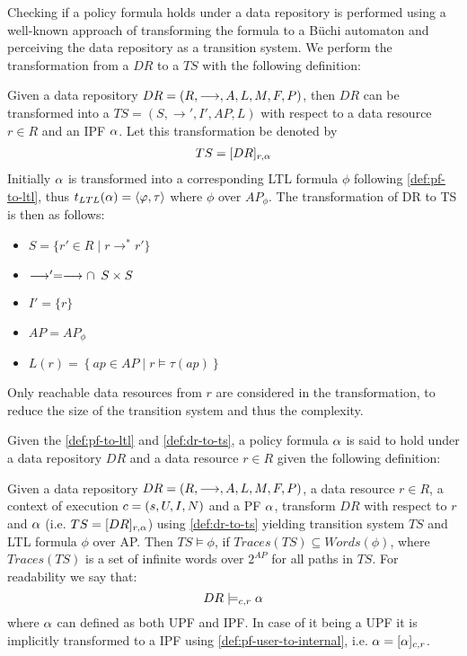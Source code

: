 Checking if a policy formula holds under a data repository is performed using a well-known approach of transforming the formula to a Büchi automaton and perceiving the data repository as a transition system. We perform the transformation from a $DR$ to a $TS$ with the following definition:
\begin{definition}\label{def:dr-to-ts}
Given a data repository $DR= \left( R, \longrightarrow, A, L, M, F, P \right)$, then $DR$ can be transformed into a $TS=\left(S, \longrightarrow', I', AP, L \right)$ with respect to a data resource $r \in R$ and an IPF $\alpha$. Let this transformation be denoted by
\begin{align*}
    TS = [DR]_{r,\alpha}    
\end{align*}
Initially $\alpha$ is transformed into a corresponding LTL formula $\phi$ following \autoref{def:pf-to-ltl}, thus $t_{LTL}(\alpha) =  \langle \varphi, \tau \rangle$ where $\phi$ over $AP_\phi$. The transformation of DR to TS is then as follows:
\begin{itemize}
  \item $S = \{ r' \in R \mid r \longrightarrow^\ast r' \}$
  \item $\longrightarrow' = \longrightarrow \cap \enskip S \times S$
  \item $I' = \{r\}$
  \item $AP = AP_\phi$
  \item $L(r) = \left\{ ap \in AP \mid r \models \tau(ap) \right\}$
\end{itemize}
Only reachable data resources from $r$ are considered in the transformation, to reduce the size of the transition system and thus the complexity.
\end{definition}
Given the \autoref{def:pf-to-ltl} and \autoref{def:dr-to-ts}, a policy formula $\alpha$ is said to hold under a data repository $DR$ and a data resource $r \in R$ given the following definition:
\begin{definition}
Given a data repository $DR= \left( R, \longrightarrow, A, L, M, F, P \right)$, a data resource $r \in R$, a context of execution $c = \left( s, U, I, N \right)$ and a PF $\alpha$, transform $DR$ with respect to $r$ and $\alpha$ (i.e. $TS = [DR]_{r,\alpha}$) using \autoref{def:dr-to-ts} yielding transition system $TS$ and LTL formula $\phi$ over AP. Then $TS \models \phi$, if $Traces(TS) \subseteq Words(\phi)$, where $Traces(TS)$ is a set of infinite words over $2^{AP}$ for all paths in $TS$. For readability we say that:
\begin{equation*}
    DR \models_{c,r} \alpha
\end{equation*}
where $\alpha$ can defined as both UPF and IPF. In case of it being a UPF it is implicitly transformed to a IPF using \autoref{def:pf-user-to-internal}, i.e. $\alpha = [\alpha]_{c,r}$.
\end{definition}